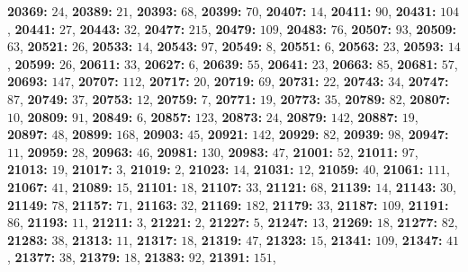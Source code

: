 \textsf{\bfseries 20369:} $24$, \textsf{\bfseries 20389:} $21$, \textsf{\bfseries 20393:} $68$, \textsf{\bfseries 20399:} $70$, \textsf{\bfseries 20407:} $14$, \textsf{\bfseries 20411:} $90$, \textsf{\bfseries 20431:} $104$, \textsf{\bfseries 20441:} $27$, \textsf{\bfseries 20443:} $32$, \textsf{\bfseries 20477:} $215$, \textsf{\bfseries 20479:} $109$, \textsf{\bfseries 20483:} $76$, \textsf{\bfseries 20507:} $93$, \textsf{\bfseries 20509:} $63$, \textsf{\bfseries 20521:} $26$, \textsf{\bfseries 20533:} $14$, \textsf{\bfseries 20543:} $97$, \textsf{\bfseries 20549:} $8$, \textsf{\bfseries 20551:} $6$, \textsf{\bfseries 20563:} $23$, \textsf{\bfseries 20593:} $14$, \textsf{\bfseries 20599:} $26$, \textsf{\bfseries 20611:} $33$, \textsf{\bfseries 20627:} $6$, \textsf{\bfseries 20639:} $55$, \textsf{\bfseries 20641:} $23$, \textsf{\bfseries 20663:} $85$, \textsf{\bfseries 20681:} $57$, \textsf{\bfseries 20693:} $147$, \textsf{\bfseries 20707:} $112$, \textsf{\bfseries 20717:} $20$, \textsf{\bfseries 20719:} $69$, \textsf{\bfseries 20731:} $22$, \textsf{\bfseries 20743:} $34$, \textsf{\bfseries 20747:} $87$, \textsf{\bfseries 20749:} $37$, \textsf{\bfseries 20753:} $12$, \textsf{\bfseries 20759:} $7$, \textsf{\bfseries 20771:} $19$, \textsf{\bfseries 20773:} $35$, \textsf{\bfseries 20789:} $82$, \textsf{\bfseries 20807:} $10$, \textsf{\bfseries 20809:} $91$, \textsf{\bfseries 20849:} $6$, \textsf{\bfseries 20857:} $123$, \textsf{\bfseries 20873:} $24$, \textsf{\bfseries 20879:} $142$, \textsf{\bfseries 20887:} $19$, \textsf{\bfseries 20897:} $48$, \textsf{\bfseries 20899:} $168$, \textsf{\bfseries 20903:} $45$, \textsf{\bfseries 20921:} $142$, \textsf{\bfseries 20929:} $82$, \textsf{\bfseries 20939:} $98$, \textsf{\bfseries 20947:} $11$, \textsf{\bfseries 20959:} $28$, \textsf{\bfseries 20963:} $46$, \textsf{\bfseries 20981:} $130$, \textsf{\bfseries 20983:} $47$, \textsf{\bfseries 21001:} $52$, \textsf{\bfseries 21011:} $97$, \textsf{\bfseries 21013:} $19$, \textsf{\bfseries 21017:} $3$, \textsf{\bfseries 21019:} $2$, \textsf{\bfseries 21023:} $14$, \textsf{\bfseries 21031:} $12$, \textsf{\bfseries 21059:} $40$, \textsf{\bfseries 21061:} $111$, \textsf{\bfseries 21067:} $41$, \textsf{\bfseries 21089:} $15$, \textsf{\bfseries 21101:} $18$, \textsf{\bfseries 21107:} $33$, \textsf{\bfseries 21121:} $68$, \textsf{\bfseries 21139:} $14$, \textsf{\bfseries 21143:} $30$, \textsf{\bfseries 21149:} $78$, \textsf{\bfseries 21157:} $71$, \textsf{\bfseries 21163:} $32$, \textsf{\bfseries 21169:} $182$, \textsf{\bfseries 21179:} $33$, \textsf{\bfseries 21187:} $109$, \textsf{\bfseries 21191:} $86$, \textsf{\bfseries 21193:} $11$, \textsf{\bfseries 21211:} $3$, \textsf{\bfseries 21221:} $2$, \textsf{\bfseries 21227:} $5$, \textsf{\bfseries 21247:} $13$, \textsf{\bfseries 21269:} $18$, \textsf{\bfseries 21277:} $82$, \textsf{\bfseries 21283:} $38$, \textsf{\bfseries 21313:} $11$, \textsf{\bfseries 21317:} $18$, \textsf{\bfseries 21319:} $47$, \textsf{\bfseries 21323:} $15$, \textsf{\bfseries 21341:} $109$, \textsf{\bfseries 21347:} $41$, \textsf{\bfseries 21377:} $38$, \textsf{\bfseries 21379:} $18$, \textsf{\bfseries 21383:} $92$, \textsf{\bfseries 21391:} $151$, 

